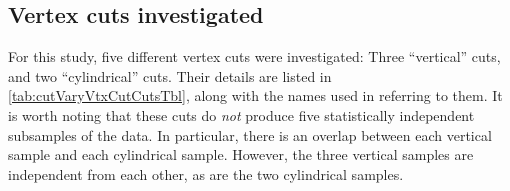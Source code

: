 \documentclass[../thesis.tex]{subfiles}
\begin{document}
\begin{comment}
Before going into the details of the efficiency calculation, it is worthwhile to demonstrate \emph{why} it is worthwhile to carry it out in the first place. First, we must define some vertex cuts to investigate. \autoref{tab:cutVaryVtxCutCutsTbl} lists five cuts along with the names we will use when referring to them in the remainder of this chapter. Using those definitions, Fig.~XXX shows the best-fit oscillation parameters obtained when applying these cuts without any efficiency correction. We expect some scatter, given that we are analyzing statistically independent subsamples.\footnote{More precisely, the three vertical cuts are statistically independent from each other, and likewise for the two radial cuts, but there \emph{is} a degree of overlap between each vertical and each radial cut. The overall point remains, however.}. Since we know that roughly half of the fit's uncertainty comes from statistics (as discussed in XXX fitting chapter), and since the vertical (radial) cuts approximately divide the sample into thirds (halves), we can estimate the statistical uncertainty on each subsample to be between $0.5\sqrt{2}$ and $0.5\sqrt{3}$ of the total (full sample statistical + systematic) uncertainty, i.e. 70--85\% of the total error bar. From Fig~XXX, it is apparent that the scale of the scatter is slightly larger than 1$\sigma$. While a mere statistical fluctuation cannot be ruled out, this result suggests that we should attempt to determine whether an AD-dependent efficiency variation may be playing a role (in which case a correction should be applied). As we will shortly show, when we measure the vertex efficiency, we do in fact find different values among the ADs, and applying a correction indeed reduces the scatter between the fit results.
\end{comment}

\begin{comment}
(XXX note we haven't actually plotted the results of applying no efficiency correction. The scatter might be well above 1sigma in which case we need to reword the above.)
\end{comment}

\subsection{Vertex cuts investigated}
\label{sec:cutVaryVtxCutDescOfCuts}

For this study, five different vertex cuts were investigated: Three ``vertical'' cuts, and two ``cylindrical'' cuts. Their details are listed in \autoref{tab:cutVaryVtxCutCutsTbl}, along with the names used in referring to them. It is worth noting that these cuts do \emph{not} produce five statistically independent subsamples of the data. In particular, there is an overlap between each vertical sample and each cylindrical sample. However, the three vertical samples are independent from each other, as are the two cylindrical samples.
\end{document}
